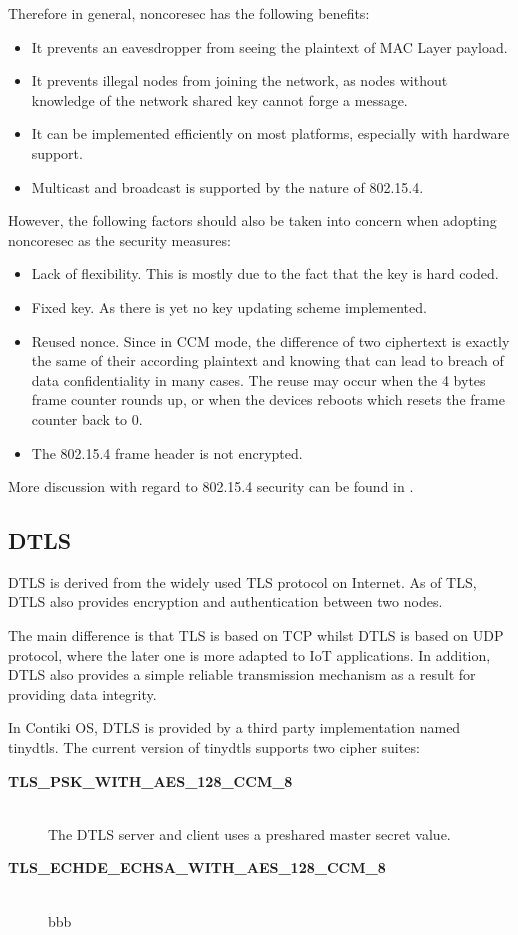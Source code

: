 Therefore in general, noncoresec has the following benefits:
\begin{itemize}
\item It prevents an eavesdropper from seeing the plaintext of MAC Layer payload.
\item It prevents illegal nodes from joining the network, as nodes without knowledge of the network shared key cannot forge a message.
\item It can be implemented efficiently on most platforms, especially with hardware support.
\item Multicast and broadcast is supported by the nature of 802.15.4.
\end{itemize}

However, the following factors should also be taken into concern when adopting noncoresec as the security measures:
\begin{itemize}
\item Lack of flexibility. This is mostly due to the fact that the key is hard coded.
\item Fixed key. As there is yet no key updating scheme implemented. 
\item Reused nonce. Since in CCM mode, the difference of two ciphertext is exactly the same of their according plaintext and knowing that can lead to breach of data confidentiality in many cases. The reuse may occur when the 4 bytes frame counter rounds up, or when the devices reboots which resets the frame counter back to $0$.
\item The 802.15.4 frame header is not encrypted.
\end{itemize}

More discussion with regard to 802.15.4 security can be found in \cite{802154sec}.

\subsection{DTLS}
DTLS is derived from the widely used TLS protocol on Internet. As of TLS, DTLS also provides encryption and authentication between two nodes. 

The main difference is that TLS is based on TCP whilst DTLS is based on UDP protocol, where the later one is more adapted to IoT applications. In addition, DTLS also provides a simple reliable transmission mechanism as a result for providing data integrity.

In Contiki OS, DTLS is provided by a third party implementation named tinydtls\cite{tinydtls}. The current version of tinydtls supports two cipher suites:
\begin{description}
\item[\textbf{TLS\_PSK\_WITH\_AES\_128\_CCM\_8}] \hfill \\
The DTLS server and client uses a preshared master secret value. 
\item[\textbf{TLS\_ECHDE\_ECHSA\_WITH\_AES\_128\_CCM\_8}] \hfill \\
bbb
\end{description}

